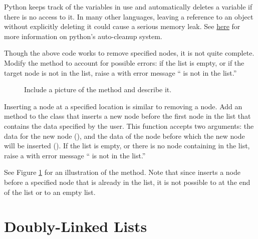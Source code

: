 \begin{warn}

Python keeps track of the variables in use and automatically deletes a variable if there is no access to it.
In many other languages, leaving a reference to an object without explicitly deleting it could cause a serious memory leak.
See \href{https://docs.python.org/2/library/gc.html}{here} for more information on python's auto-cleanup system.
\end{warn}

\begin{problem}
Though the above code works to remove specified nodes, it is not quite complete.
Modify the  method to account for possible errors: if the list is empty, or if the target node is not in the list, raise a  with error message `` is not in the list.''
\end{problem}

\begin{figure}
\centering
\caption{Include a picture of the  method and describe it.}
\label{fig:insert}
\end{figure}

\begin{problem}
Inserting a node at a specified location is similar to removing a node.
Add an  method to the  class that inserts a new node before the first node in the list that contains the data specified by the user.
This function accepts two arguments: the data for the new node (), and the data of the node before which the new node will be inserted ().
If the list is empty, or there is no node containing  in the list, raise a  with error message `` is not in the list.''

See Figure \ref{fig:insert} for an illustration of the  method.
Note that since  inserts a node before a specified node that is already in the list, it is not possible to  at the end of the list or to an empty list.
\end{problem}

\section*{Doubly-Linked Lists}

